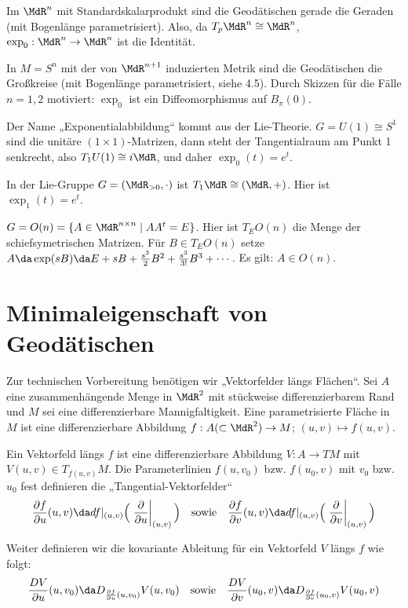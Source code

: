 \documentclass[a4paper,twoside,DIV15,BCOR12mm]{scrbook}
\begin{document}
\begin{beispiele}
\item Im $\MdR^n$ mit Standardskalarprodukt sind die Geodätischen gerade die Geraden (mit Bogenlänge parametrisiert). Also, da $T_p\MdR^n \cong \MdR^n$, $\exp_0: \MdR^n \to \MdR^n$ ist die Identität.
\item In $M=S^n$ mit der von $\MdR^{n+1}$ induzierten Metrik sind die Geodätischen die Großkreise (mit Bogenlänge parametrisiert, siehe 4.5). Durch Skizzen für die Fälle $n=1,2$ motiviert: $\exp_0$ ist ein Diffeomorphismus auf $B_\pi(0)$.
\item Der Name „Exponentialabbildung“ kommt aus der Lie-Theorie. $G = U(1) \cong S^1$ sind die unitäre $(1\times 1)$-Matrizen, dann steht der Tangentialraum am Punkt 1 senkrecht, also $T_1U(1) \cong i\MdR$, und daher $\exp_0(t) = e^{t}$.
\item In der Lie-Gruppe $G=(\MdR_{>0},\cdot)$ ist $T_1\MdR \cong (\MdR,+)$. Hier ist $\exp_1(t) = e^t$.
\item $G=O(n)=\{A\in \MdR^{n\times n} \mid A A^t = E \}$. Hier ist $T_EO(n)$ die Menge der schiefsymetrischen Matrizen. Für $B\in T_EO(n)$ setze $A \da \exp(sB) \da E + sB + \frac{s^2}{2}B^2 + \frac{s^3}{3!}B^3 + \cdots$. Es gilt: $A\in O(n)$.
\end{beispiele}

\section{Minimaleigenschaft von Geodätischen}

Zur technischen Vorbereitung benötigen wir „Vektorfelder längs Flächen“. Sei $A$ eine zusammenhängende Menge in $\MdR^2$ mit stückweise differenzierbarem Rand und $M$ sei eine differenzierbare Mannigfaltigkeit. Eine parametrisierte Fläche in $M$ ist eine differenzierbare Abbildung $f: A (\subset \MdR^2) \to M$; $(u,v) \mapsto f(u,v)$.

Ein Vektorfeld längs $f$ ist eine differenzierbare Abbildung $V: A \to TM$ mit $V(u,v) \in T_{f(u,v)}M$. Die Parameterlinien $f(u,v_0)$ bzw. $f(u_0,v)$ mit $v_0$ bzw. $u_0$ fest definieren die „Tangential-Vektorfelder“ 
\[
\frac {\partial f}{\partial u}(u,v) \da df|_{(u,v)} \Big(\left.\frac\partial{\partial u}\right|_{(u,v)}\Big)
\quad\text{sowie}\quad
\frac {\partial f}{\partial v}(u,v) \da df|_{(u,v)} \Big(\left.\frac\partial{\partial v}\right|_{(u,v)}\Big)
\]

Weiter definieren wir die kovariante Ableitung für ein Vektorfeld $V$ längs $f$ wie folgt:
\[
\frac{DV}{\partial u}(u,v_0) \da D_{\frac{\partial f}{\partial u}(u,v_0)} V(u,v_0)
\quad\text{sowie}\quad
\frac{DV}{\partial v}(u_0,v) \da D_{\frac{\partial f}{\partial v}(u_0,v)} V(u_0,v)
\]
\end{document}

